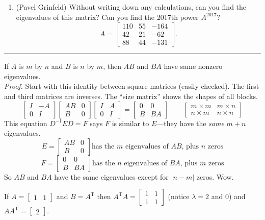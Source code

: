 \documentclass[14pt, a4paper]{article}
\begin{document}
\begin{enumerate}[resume]
    \item (Pavel Grinfeld) Without writing down any calculations, can you find the eigenvalues of this matrix? Can you find the 2017th power $A^{2017}$?
          \[
              A = \begin{bmatrix} 110 & 55 & -164 \\ 42 & 21 & -62 \\ 88 & 44 & -131 \end{bmatrix} .
          \]
\end{enumerate}

\noindent\rule{\textwidth}{0.4pt}

\noindent If $A$ is $m$ by $n$ and $B$ is $n$ by $m$, then $AB$ and $BA$ have same nonzero eigenvalues. \\
\textit{Proof.} Start with this identity between square matrices (easily checked). The first and third matrices are inverses. The ``size matrix'' shows the shapes of all blocks.
\[
    \begin{bmatrix} I & -A \\ 0 & I \end{bmatrix} \begin{bmatrix} AB & 0 \\ B & 0 \end{bmatrix} \begin{bmatrix} I & A \\ 0 & I \end{bmatrix} = \begin{bmatrix} 0 & 0 \\ B & BA \end{bmatrix} \qquad \begin{bmatrix} m \times m & m \times n \\ n \times m & n \times n \end{bmatrix}
\]
This equation $D^{-1} E D = F$ says $F$ is similar to $E$---they have the \textit{same} $m+n$ eigenvalues.
\[
    E = \begin{bmatrix} AB & 0 \\ B & 0 \end{bmatrix} \text{has the } m \text{ eigenvalues of } AB \text{, plus } n \text{ zeros}
\]
\[
    F = \begin{bmatrix} 0 & 0 \\ B & BA \end{bmatrix} \text{has the } n \text{ eigenvalues of } BA \text{, plus } m \text{ zeros}
\]
So $AB$ and $BA$ have the same eigenvalues except for $|n - m|$ zeros. Wow.

\noindent If $A = \begin{bmatrix} 1 & 1 \end{bmatrix}$ and $B = A^{\mathrm{T}}$ then $A^{\mathrm{T}}A = \begin{bmatrix} 1 & 1 \\ 1 & 1 \end{bmatrix}$ (notice $\lambda = 2$ and $0$) and $AA^{\mathrm{T}} = \begin{bmatrix} 2 \end{bmatrix}$.
\end{document}

